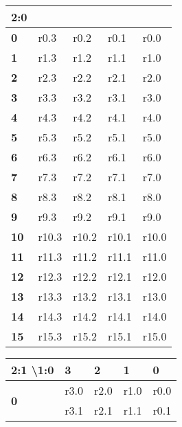 \begin{table}[h!]
\centering
\begin{tabular}{|l|l l l l|}
\hline
\multicolumn{1}{|l|}{2:0} & \textbf{ } & \textbf{ } & \textbf{ } & \textbf{ } \\ \hline
\textbf{0 }   & r0.3       & r0.2       & r0.1       & r0.0       \\ \hline
\textbf{1 }   & r1.3       & r1.2       & r1.1       & r1.0       \\ \hline
\textbf{2 }   & r2.3       & r2.2       & r2.1       & r2.0       \\ \hline
\textbf{3 }   & r3.3       & r3.2       & r3.1       & r3.0       \\ \hline
\textbf{4 }   & r4.3       & r4.2       & r4.1       & r4.0       \\ \hline
\textbf{5 }   & r5.3       & r5.2       & r5.1       & r5.0       \\ \hline
\textbf{6 }   & r6.3       & r6.2       & r6.1       & r6.0       \\ \hline
\textbf{7 }   & r7.3       & r7.2       & r7.1       & r7.0       \\ \hline
\textbf{8 }   & r8.3       & r8.2       & r8.1       & r8.0       \\ \hline
\textbf{9 }   & r9.3       & r9.2       & r9.1       & r9.0       \\ \hline
\textbf{10}   & r10.3      & r10.2      & r10.1      & r10.0      \\ \hline
\textbf{11}   & r11.3      & r11.2      & r11.1      & r11.0      \\ \hline
\textbf{12}   & r12.3      & r12.2      & r12.1      & r12.0      \\ \hline
\textbf{13}   & r13.3      & r13.2      & r13.1      & r13.0      \\ \hline
\textbf{14}   & r14.3      & r14.2      & r14.1      & r14.0      \\ \hline
\textbf{15}   & r15.3      & r15.2      & r15.1      & r15.0      \\ \hline
\end{tabular}
\quad
\begin{tabular}{|l|l|l|l|l|}
\hline
\multicolumn{1}{|l|}{2:1 \textbackslash 1:0} & \textbf{3} & \textbf{2} & \textbf{1} & \textbf{0} \\ \hline
\multirow{4}{*}{\textbf{0}}                  & r3.0       & r2.0       & r1.0       & r0.0       \\
                                             & r3.1       & r2.1       & r1.1       & r0.1       \\

\end{tabular}
\end{table}
